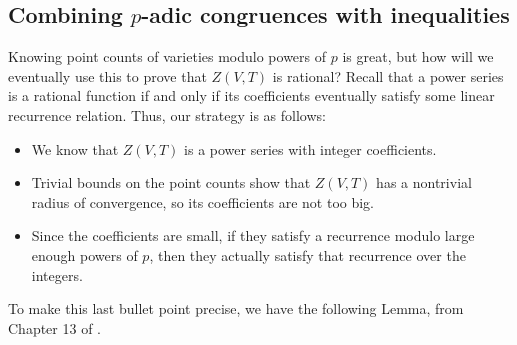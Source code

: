 \subsection{Combining $p$-adic congruences with inequalities}

Knowing point counts of varieties modulo powers of $p$ is great, but how will we eventually use this to prove that $Z(V,T)$ is rational? Recall that a power series is a rational function if and only if its coefficients eventually satisfy some linear recurrence relation. Thus, our strategy is as follows:
\begin{itemize}
\item We know that $Z(V,T)$ is a power series with integer coefficients.
\item Trivial bounds on the point counts show that $Z(V,T)$ has a nontrivial radius of convergence, so its coefficients are not too big.
\item Since the coefficients are small, if they satisfy a recurrence modulo large enough powers of $p$, then they actually satisfy that recurrence over the integers.
\end{itemize}

To make this last bullet point precise, we have the following Lemma, from Chapter 13 of \cite{local-fields}.

